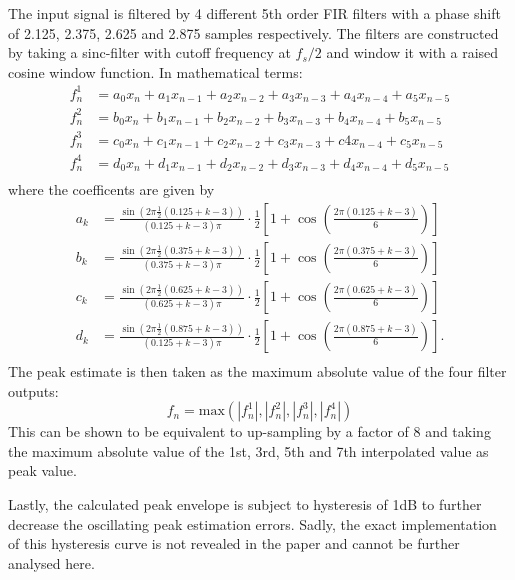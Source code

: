 \documentclass[../main2.tex]{subfiles}
\begin{document}
The input signal is filtered by 4 different 5th order FIR filters with a phase shift of 2.125, 2.375, 2.625 and 2.875 samples respectively. The filters are constructed by taking a sinc-filter with cutoff frequency at $f_s/2$ and window it with a raised cosine window function. In mathematical terms:
\begin{equation}
\begin{split}
f^1_n &= a_0 x_{n} + a_1 x_{n-1} + a_2 x_{n-2} + a_3 x_{n-3} + a_4 x_{n-4} + a_5 x_{n-5} \\
f^2_n &= b_0 x_{n} + b_1 x_{n-1} + b_2 x_{n-2} + b_3 x_{n-3} + b_4 x_{n-4} + b_5 x_{n-5} \\
f^3_n &= c_0 x_{n} + c_1 x_{n-1} + c_2 x_{n-2} + c_3 x_{n-3} + c4 x_{n-4} + c_5 x_{n-5} \\
f^4_n &= d_0 x_{n} + d_1 x_{n-1} + d_2 x_{n-2} + d_3 x_{n-3} + d_4 x_{n-4} + d_5 x_{n-5} \\
\end{split}
\end{equation}
where the coefficents are given by
\begin{equation}
\begin{split}
a_k &= \frac{\sin (2 \pi \frac{1}{2} (0.125+k-3) )}{(0.125+k-3)\pi} \cdot \frac{1}{2}\left[1+\cos \left(\frac{2 \pi (0.125+k-3)}{6} \right) \right] \\
b_k &= \frac{\sin (2 \pi \frac{1}{2} (0.375+k-3) )}{(0.375+k-3)\pi} \cdot \frac{1}{2}\left[1+\cos \left(\frac{2 \pi (0.375+k-3)}{6} \right) \right] \\
c_k &= \frac{\sin (2 \pi \frac{1}{2} (0.625+k-3) )}{(0.625+k-3)\pi} \cdot \frac{1}{2}\left[1+\cos \left(\frac{2 \pi (0.625+k-3)}{6} \right) \right] \\
d_k &= \frac{\sin (2 \pi \frac{1}{2} (0.875+k-3) )}{(0.125+k-3)\pi} \cdot \frac{1}{2}\left[1+\cos \left(\frac{2 \pi (0.875+k-3)}{6} \right) \right]. \\
\end{split}
\end{equation}
The peak estimate is then taken as the maximum absolute value of the four filter outputs:
\begin{equation}
f_n = \text{max}(|f^1_n|, |f^2_n|, |f^3_n|, |f^4_n|)
\end{equation}
This can be shown to be equivalent to up-sampling by a factor of 8 and taking the maximum absolute value of the 1st, 3rd, 5th and 7th interpolated value as peak value. 

Lastly, the calculated peak envelope is subject to hysteresis of 1dB to further decrease the oscillating peak estimation errors. Sadly, the exact implementation of this hysteresis curve is not revealed in the paper and cannot be further analysed here.
\end{document}

